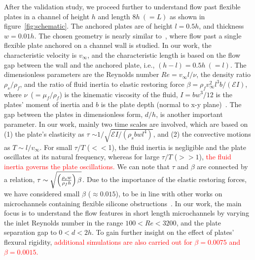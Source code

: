 \documentclass[aps,pre,twocolumn,aps,longbibliography]{revtex4-1}
\begin{document}
	


		
	After the validation study, we proceed further to understand flow past flexible plates in a channel of height $h$ and length $8h~(=L)$ as shown in figure~\ref{fig:schematic}. The anchored plates are of height $l=0.5h$, and thickness $w=0.01h$. The chosen geometry is nearly similar to~\cite{Jin2018}, where flow past a single flexible plate anchored on a channel wall is studied. In our work, the characteristic velocity is $v_\infty$, and the characteristic length is based on the flow gap between the wall and the anchored plate, i.e., $(h-l)=0.5h~(=l)$. The dimensionless parameters are the Reynolds number $Re=v_{\infty}l/\nu$, the density ratio $\rho_s/\rho_f$, and the ratio of fluid inertia to elastic restoring force $\beta=\rho_f v_{\infty}^2 l^3 b/(\mathcal{E}I)$, where $\nu$~($=\mu_f/\rho_f$) is the kinematic viscosity of the fluid, $I=bw^3/12$ is the plates' moment of inertia and $b$ is the plate depth (normal to x-y plane)~\cite{Bhageri2012,Pinelli2015}. 
	The gap between the plates in dimensionless form, $d/h$, is another important parameter. In our work, mainly two time scales are involved, which are based on (1) the plate's elasticity as $\tau$ $\sim{1/\sqrt{\mathcal{E}I/(\rho_s bwl^4)}}$, and (2) the convective motions as $T\sim l/v_{\infty}$. For small $\tau/T$ ($<<$1), the fluid inertia is negligible and the plate oscillates at its natural frequency, whereas for large $\tau/T$ ($>>1$), \textcolor{red}{the fluid inertia governs the plate oscillations.} We can note that $\tau$ and $\beta$ are connected by a relation, $\tau\sim\sqrt{\left({\rho_s w\over\rho_f h}\right)\beta}$. Due to the importance of the elastic restoring forces, we have considered small $\beta$ ($\approx 0.015$), to be in line with other works on microchannels containing flexible silicone obstructions~\cite{Vandenberghe2004}. In our work, the main focus is to understand the flow features in short length microchannels by varying the inlet Reynolds number in the range $100<Re<3200$, and the plate separation gap to $0<d<2h$. To gain further insight on the effect of plates' flexural rigidity, \textcolor{red}{additional simulations are also carried out for $\beta=0.0075$ and $\beta=0.0015$.}
	
\end{document}
